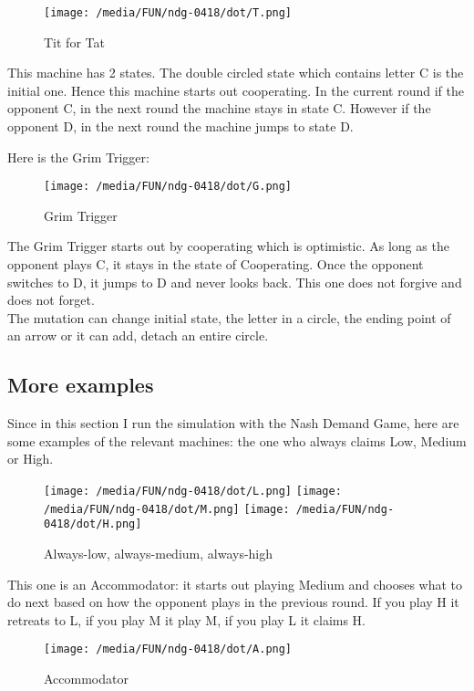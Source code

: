 \documentclass[12.5pt]{report}
\begin{document}
\begin{figure}[h!]
\center
\texttt{[image: /media/FUN/ndg-0418/dot/T.png]}
\caption{Tit for Tat}
\end{figure}

This machine has 2 states. The double circled state which contains letter C is the initial one. Hence this machine starts out cooperating. In the current round if the opponent C, in the next round the machine stays in state C. However if the opponent D, in the next round the machine jumps to state D.

Here is the Grim Trigger:

\begin{figure}[h!]
\center
\texttt{[image: /media/FUN/ndg-0418/dot/G.png]}
\caption{Grim Trigger}
\end{figure}

The Grim Trigger starts out by cooperating which is optimistic. As long as the opponent plays C, it stays in the state of Cooperating. Once the opponent switches to D, it jumps to D and never looks back. This one does not forgive and does not forget.\\

The mutation can change initial state, the letter in a circle, the ending point of an arrow or it can add, detach an entire circle.

\subsection{More examples}

Since in this section I run the simulation with the Nash Demand Game, here are some examples of the relevant machines: the one who always claims Low, Medium or High.

\begin{figure}[h!]
\center
\texttt{[image: /media/FUN/ndg-0418/dot/L.png]}
\texttt{[image: /media/FUN/ndg-0418/dot/M.png]}
\texttt{[image: /media/FUN/ndg-0418/dot/H.png]}
\caption{Always-low, always-medium, always-high}
\end{figure}

This one is an Accommodator: it starts out playing Medium and chooses what to do next based on how the opponent plays in the previous round. If you play H it retreats to L, if you play M it play M, if you play L it claims H.

\begin{figure}[h!]
\center
\texttt{[image: /media/FUN/ndg-0418/dot/A.png]}
\caption{Accommodator}
\end{figure}
\end{document}
